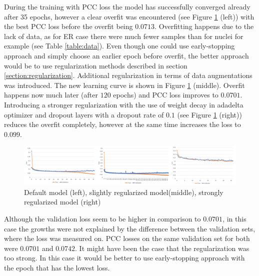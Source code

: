 During the training with PCC loss the model has successfully converged already after 35 epochs, however a clear overfit was encountered (see Figure \ref{fig:er-overfit} (left)) with the best PCC loss before the overfit being $0.0713$. Overfitting happens due to the lack of data, as for ER case there were much fewer samples than for nuclei for example (see Table \ref{table:data}). Even though one could use early-stopping approach and simply choose an earlier epoch before overfit, the better approach would be to use regularization methods described in section \ref{section:regularization}. Additional regularization in terms of data augmentations was introduced. The new learning curve is shown in Figure \ref{fig:er-overfit} (middle). Overfit happens now much later (after $120$ epochs) and PCC loss improves to $0.0701$. Introducing a stronger regularization with the use of weight decay in adadelta optimizer and dropout layers with a dropout rate of $0.1$ (see Figure \ref{fig:er-overfit} (right)) reduces the overfit completely, however at the same time increases the loss to $0.099$.
\begin{figure}[H]
	\begin{center}
		\includegraphics[width=\linewidth]{bilder/ER/segmentation/reg-not-reg.png}
		\caption{Default model (left), slightly regularized model(middle), strongly regularized model (right)}\label{fig:er-overfit}
	\end{center}
\end{figure}

Although the validation loss seem to be higher in comparison to $0.0701$, in this case the growths were not explained by the difference between the validation sets, where the loss was measured on. PCC losses on the same validation set for both were $0.0701$ and $0.0742$. It might have been the case that the regularization was too strong. In this case it would be better to use early-stopping approach with the epoch that has the lowest loss.